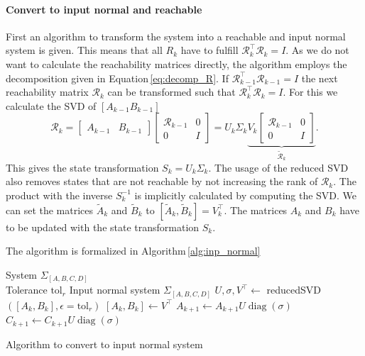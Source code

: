 \documentclass[doctype=mastersthesis,BCOR=15mm,biblatex]{ldvbook}%
\newcommand{\Input}{\Require}
\newcommand{\Output}{\Ensure}
\newcommand{\spaceIO}{\phantom{Output:Input}\hspace{-0.7cm}}
\DeclareMathOperator{\diag}{diag}
\newcommand{\R}{\mathcal{R}} %
\newcommand{\Ob}{\mathcal{O}} %
\newcommand{\eye}{I} %
\begin{document}

\paragraph{Convert to input normal and reachable}
First an algorithm to transform the system into a reachable and input normal system is given.
This means that all $R_k$ have to fulfill $\R_{k}^\top \R_{k}=\eye$.
As we do not want to calculate the reachability matrices directly, the algorithm employs the decomposition given in Equation\,\ref{eq:decomp_R}.
If $\R_{k-1}^\top \R_{k-1}=\eye$ the next reachability matrix $\R_{k}$ can be transformed such that $\R_{k}^\top \R_{k}=\eye$.
For this we calculate the SVD of $[A_{k-1} B_{k-1}]$
\begin{equation}
\R_k = 
\begin{bmatrix}
A_{k-1} & B_{k-1}
\end{bmatrix}
\begin{bmatrix}
\R_{k-1} &0\\
0& \eye
\end{bmatrix}
=U_k\Sigma _k
\underbrace{V_k
\begin{bmatrix}
\R_{k-1} &0\\
0& \eye
\end{bmatrix}}_{\tilde{\R}_k}
.
\end{equation}
This gives the state transformation $S_k = U_k\Sigma_k$. 
The usage of the reduced SVD also removes states that are not reachable by not increasing the rank of $\R_k$.
The product with the inverse $S_k^{-1}$ is implicitly calculated by computing the SVD.
We can set the matrices $\tilde{A}_k$ and $\tilde{B}_k$ to $[\tilde{A}_k,\tilde{B}_k]=V_k^\top$.
The matrices $A_{k}$ and $B_{k}$ have to be updated with the state transformation $S_k$.

The algorithm is formalized in Algorithm\,\ref{alg:inp_normal}

\begin{algorithm}[htb]
	\begin{algorithmic}
	\Input System $\Sigma_{[A,B,C,D]}$\\
	\spaceIO Tolerance $\text{tol}_r$ 
	\Output Input normal system $\Sigma_{[A,B,C,D]}$
		\State $U,\sigma,V^\top \gets$ reducedSVD$([A_k,B_k],\epsilon=\text{tol}_r)$
		\State $[A_k,B_k] \gets V^\top$
		\State $A_{k+1}\gets A_{k+1}U\diag(\sigma)$
		\State $C_{k+1}\gets C_{k+1}U\diag(\sigma)$
	\EndFor
	\end{algorithmic}
\caption{Algorithm to convert to input normal system}\label{alg:inp_normal}
\end{algorithm}
\end{document}
